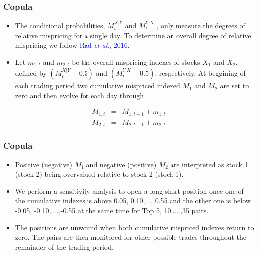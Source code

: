 \documentclass[pdf,9pt,xcolor=dvipsnames,hide notes]{beamer}
\begin{document}
\begin{frame}[label=frame4f2]
	\frametitle{Copula}
	
	\vspace{0.3cm}
	
	\begin{itemize}
		\item The conditional probabilities, $M_{t}^{X\left\vert Y\right. }$ and $%
		M_{t}^{Y\left\vert X\right. }$ , only measure the degrees of relative
		mispricing for a single day. To determine an overall degree of relative
		mispricing we follow \textcolor{blue}{Rad \emph{et al}}., \textcolor{blue}{2016}. 
		
		\vspace{0.3cm}
		
		\item Let $m_{1,t}$ and $m_{2,t}$ be the
		overall mispricing indexes of stocks $X_{1}$ and $X_{2}$, defined by $\left(
		M_{t}^{X\left\vert Y\right. }-0.5\right) $ and $\left( M_{t}^{Y\left\vert
			X\right. }-0.5\right) $, respectively. At beggining of each
		trading period two cumulative mispriced indexed $M_{1}$ and $M_{2}$ are set
		to zero and then evolve for each day through%
	\end{itemize}
	
	\begin{eqnarray*}
		M_{1,t} &=&M_{1,t-1}+m_{1,t} \\
		M_{2,t} &=&M_{2,t-1}+m_{2,t}
	\end{eqnarray*}

\end{frame}

\begin{frame}[label=frame4f3]
	\frametitle{Copula}
	
	\vspace{0.3cm}
	
	\begin{itemize}
		\item Positive (negative) $M_{1}$ and negative (positive) $M_{2}$ are interpreted
		as stock 1 (stock 2) being overvalued relative to stock 2 (stock 1).
		
		\vspace{0.3cm}
		
		\item We
		perform a sensitivity analysis to open a long-short position once one of the
		cumulative indexes is above 0.05, 0.10,..., 0.55 and the other one is below
		-0.05, -0.10,....,-0.55 at the same time for Top 5, 10,....,35 pairs.
		
		\vspace{0.3cm}
		
		\item The
		positions are unwound when both cumulative mispriced indexes return to zero.
		The pairs are then monitored for other possible trades throughout the
		remainder of the trading period.
		
	\end{itemize}
	
	
	
\end{frame}
	
\end{document}
